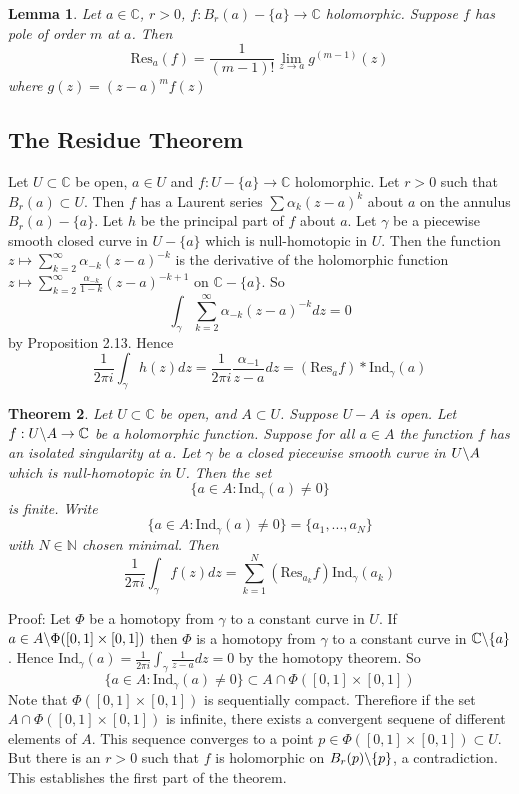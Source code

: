 \documentclass[11pt]{article}
\theoremstyle{plain}
\newtheorem{theorem}{Theorem}[section]
\newtheorem{lemma}[theorem]{Lemma}
\theoremstyle{definition}
\newcommand{\C}{\mathbb{C}}
\newcommand{\Ind}{\text{Ind}}
\newcommand{\Res}{\text{Res}}
\newcommand{\sla}{\char`\\}
\begin{document}
\begin{lemma}
Let $a \in \C$, $r > 0$, $f: B_r(a) - \{ a \} \to \C$ holomorphic. Suppose $f$ has pole of order $m$ at $a$. Then 
$$ \text{Res}_a(f) = \frac{1}{(m-1)!} \lim_{z \to a} g^{(m-1)}(z) $$
where $g(z) = (z - a)^m f(z) $
\end{lemma}

\subsection{The Residue Theorem}
Let $U \subset \C$ be open, $a \in U$ and $f: U - \{ a \} \to \C$ holomorphic. Let $r > 0$ such that $B_r(a) \subset U$. Then $f$ has a Laurent series $\sum \alpha_k (z-a)^k$ about $a$ on the annulus $B_r(a) - \{ a \}$. Let $h$ be the principal part of $f$ about $a$. Let $\gamma$ be a piecewise smooth closed curve in $U - \{ a \}$ which is null-homotopic in $U$. Then the function $z \mapsto \sum_{k=2}^\infty \alpha_{-k}(z-a)^{-k}$ is the derivative of the holomorphic function $z\mapsto \sum_{k=2}^\infty \frac{\alpha_{-k}}{1 - k} (z-a)^{-k+1}$ on $\C - \{ a \}$. So 
$$ \int_{\gamma} \sum_{k=2}^\infty \alpha_{-k}(z-a)^{-k} dz = 0 $$
by Proposition 2.13. Hence 
$$ \frac{1}{2\pi i} \int_{\gamma} h(z)dz = \frac{1}{2\pi i} \frac{\alpha_{-1}}{z-a}dz = (\text{Res}_a f) * \Ind_\gamma(a) $$

\begin{theorem}
Let $U \subset \C$ be open, and $A \subset U$. Suppose $U - A$ is open. Let $f: U \sla A \to \C$ be a holomorphic function. Suppose for all $a \in A$ the function $f$ has an isolated singularity at $a$. Let $\gamma$ be a closed piecewise smooth curve in $U \sla A$ which is null-homotopic in $U$. Then the set 
$$ \{ a \in A : \Ind_\gamma (a) \neq 0 \} $$
is finite. Write 
$$ \{ a \in A : \Ind_\gamma (a) \neq 0 \} = \{ a_1, ..., a_N\} $$
with $N \in \mathbb{N}$ chosen minimal. Then 
$$ \frac{1}{2\pi i} \int_{\gamma} f(z)dz = \sum_{k=1}^N (\Res_{a_k} f) \Ind_\gamma(a_k) $$
\end{theorem}

Proof: Let $\Phi$ be a homotopy from $\gamma$ to a constant curve in $U$. If $a \in A \sla \Phi([0, 1] \times [0,1])$ then $\Phi$ is a homotopy from $\gamma$ to a constant curve in $\C \sla \{ a \}$. Hence $\Ind_{\gamma}(a) = \frac{1}{2\pi i} \int_\gamma \frac{1}{z-a} dz = 0$ by the homotopy theorem. So
$$\{ a \in A: \Ind_{\gamma}(a) \neq 0 \} \subset A \cap \Phi([0, 1] \times [0, 1]) $$
Note that $\Phi([0,1] \times [0,1])$ is sequentially compact. Therefiore if the set $ A \cap \Phi([0, 1] \times [0, 1])$ is infinite, there exists a convergent sequene of different elements of $A$. This sequence converges to a point $p \in \Phi([0,1] \times [0,1]) \subset U$. But there is an $r > 0$ such that $f$ is holomorphic on $B_r(p) \sla \{ p\}$, a contradiction. This establishes the first part of the theorem.
\end{document}
